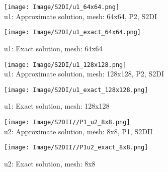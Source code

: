\documentclass[a4paper,11pt]{article}
\begin{document}
\begin{figure}[bhtp]
  \hspace{35.pt}
  \begin{minipage}[t]{0.4 \textwidth}
    \centering
    \texttt{[image: Image/S2DI/u1\_64x64.png]}\\
    \caption{u1: Approximate solution, mesh: 64x64, P2, S2DI}\label{fig:fig_P2_u1_64x64}
  \end{minipage}
  \hspace{0.1in}
  \begin{minipage}[t]{0.4 \textwidth}
    \centering
    \texttt{[image: Image/S2DI/u1\_exact\_64x64.png]}\\
    \caption{u1: Exact solution, mesh: 64x64}\label{fig:fig_P2u1_exact_64x64}
  \end{minipage}
\end{figure}
\begin{figure}[bhtp]
  \hspace{35.pt}
  \begin{minipage}[t]{0.4 \textwidth}
    \centering
    \texttt{[image: Image/S2DI/u1\_128x128.png]}\\
    \caption{u1: Approximate solution, mesh: 128x128, P2, S2DI}\label{fig:fig_P2_u1_128x128}
  \end{minipage}
  \hspace{0.1in}
  \begin{minipage}[t]{0.4 \textwidth}
    \centering
    \texttt{[image: Image/S2DI/u1\_exact\_128x128.png]}\\
    \caption{u1: Exact solution, mesh: 128x128}\label{fig:fig_P2u1_exact_128x128}
  \end{minipage}
\end{figure}

\begin{figure}[bhpt]
  \hspace{35.pt}
  \begin{minipage}[t]{0.4 \textwidth}
    \centering
    \texttt{[image: Image/S2DII//P1\_u2\_8x8.png]}  \\
    \caption{u2: Approximate solution, mesh: 8x8, P1, S2DII}\label{fig:fig_P2_u2_8x8}
  \end{minipage}
  \hspace{0.1in}
  \begin{minipage}[t]{0.4 \textwidth}
    \centering
    \texttt{[image: Image/S2DII//P1u2\_exact\_8x8.png]}
    \caption{u2: Exact solution, mesh: 8x8}\label{fig:fig_P2u2_exact_8x8}
  \end{minipage}
\end{figure}
\end{document}
